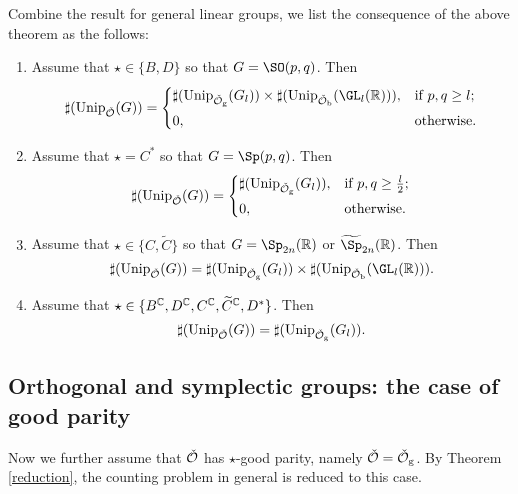 \documentclass[counting_main.tex]{subfiles}
\begin{document}
Combine the result for general linear groups, we list the consequence of the
above theorem as the follows:
\begin{enumerate}[label=(\alph*)]
  \item Assume that $\star\in \{B,D\}$ so that $G=\SO(p,q)$. Then
        \[
        \sharp(\Unip_{\check \CO}(G))=
        \begin{cases}
          \sharp(\Unip_{\check \CO_{\mathrm g}}(G_l))\times \sharp(\Unip_{\check \CO_{\mathrm b}}(\GL_l(\R)) ), &\hbox{if $p,q\geq l$}; \smallskip\\
          0, &\hbox{otherwise.}
        \end{cases}
        \]
  \item Assume that $\star=C^*$ so that $G=\Sp(p,q)$. Then
        \[
        \sharp(\Unip_{\check \CO}(G))=
        \begin{cases}
          \sharp(\Unip_{\check \CO_{\mathrm g}}(G_l )), &\hbox{if $p,q\geq \frac{l}{2}$}; \smallskip\\
          0, &\hbox{otherwise.}
        \end{cases}
        \]

  \item Assume that $\star\in \{C,\widetilde C\}$ so that $G=\Sp_{2n}(\R)$ or
        $\widetilde \Sp_{2n}(\R)$. Then
        \[
        \sharp(\Unip_{\check \CO}(G))= \sharp(\Unip_{\check \CO_{\mathrm g}}(G_l))\times \sharp(\Unip_{\check \CO_{\mathrm b}}(\GL_l(\R)) ). \]
  \item Assume that $\star\in \{B^{\mathbb{C}}, D^{\mathbb{C}}, C^{\mathbb{C}},\widetilde C^{\mathbb{C}}, D^*\}$. Then
        \[
        \sharp(\mathrm{Unip}_{\check {{\mathcal {O}}}}(G))= \sharp(\mathrm{Unip}_{\check {{\mathcal {O}}}_{\mathrm g}}(G_l)).
        \]
\end{enumerate}


 \subsection{Orthogonal and symplectic groups: the case of good parity}
 Now we further assume that $\check {{\mathcal {O}}}$ has $\star$-good parity, namely
 $\check {{\mathcal {O}}}=\check {{\mathcal {O}}}_{\mathrm g}$. By Theorem \ref{reduction}, the counting
 problem in general is reduced to this case.



\end{document}
